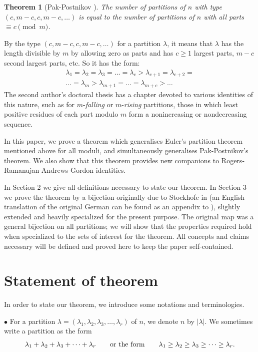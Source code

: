 \documentclass{amsart}
\newtheorem{theorem}{Theorem}
\begin{document}
 \begin{theorem}[Pak-Postnikov \cite{Pak-Postnikov}]   \label{puretype thm} 
 The number of partitions of $n$ with type $(c, m-c, c, m-c,\dots)$  is equal to the number of partitions of $n$ with all parts $\equiv c \pmod m$.
 \end{theorem}
By the type $(c, m-c,c,m-c,\dots)$ for a partition $\lambda$, it means that $\lambda$ has the length divisible by $m$ by allowing zero as parts  and has $c\geq 1$ largest parts, $m-c$ second largest parts, etc. So it has the form:
\begin{gather*}
\lambda_{1}=\lambda_{2}=\lambda_{3}=\dots=\lambda_{c}>\lambda_{c+1}=\lambda_{c+2}=\\
 \dots = \lambda_{m}>\lambda_{m+1}=\dots=\lambda_{m+c}>\dots
\end{gather*}
The second author's doctoral thesis \cite{KeithThesis} has a chapter devoted to various identities of this nature, such as for $m$-\emph{falling} or $m$-\emph{rising} partitions, those in which least positive residues of each part modulo $m$ form a nonincreasing or nondecreasing sequence.

In this paper, we prove a theorem which generalises Euler's partition theorem mentioned above for all moduli, and simultaneously generalises Pak-Postnikov's theorem. We also show that this theorem provides new companions to Rogers-Ramanujan-Andrews-Gordon identities. 
 
In Section 2 we give all definitions necessary to state our theorem.  In Section 3 we prove the theorem by a bijection originally due to Stockhofe in \cite{Stockhofe} (an English translation of the original German can be found as an appendix to \cite{KeithThesis}), slightly extended and heavily specialized for the present purpose.  The original map was a general bijection on all partitions; we will show that the properties required hold when specialized to the sets of interest for the theorem.  All concepts and claims necessary will be defined and proved here to keep the paper self-contained. 


\section{Statement of theorem}
In order to state our theorem, we introduce some notations and terminologies.

$\bullet$  For a partition $\lambda=(\lambda_1,\lambda_2, \lambda_{3},\dots,\lambda_{r})$ of $n$, we denote $n$ by $|\lambda |.$ We sometimes write a partition as the form
$$\lambda_1+\lambda_2+\lambda_3+\dots+\lambda_{r}  \quad \mbox{\quad or the form\quad} \quad   \lambda_1\geq\lambda_2\geq\lambda_{3}\geq\dots\geq\lambda_{r}.$$
\end{document}
